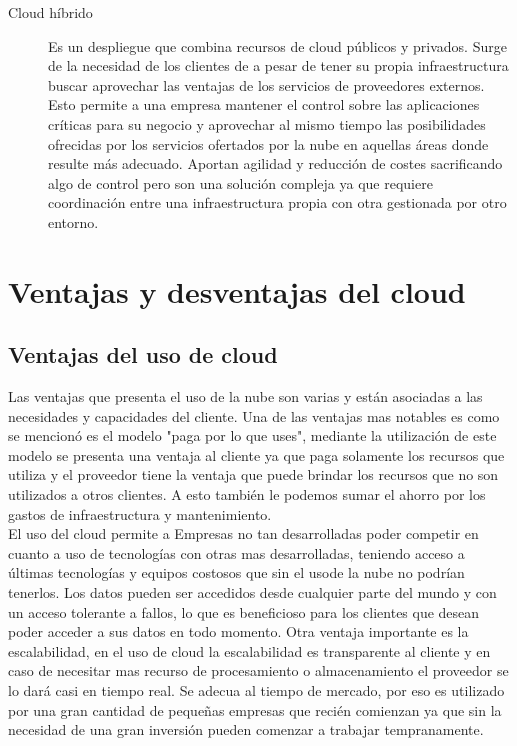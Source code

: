 \begin{description}
\item[Cloud híbrido]
Es un despliegue que combina recursos de cloud públicos y privados. Surge de la necesidad de los clientes de a pesar de tener su propia infraestructura buscar aprovechar las ventajas de los servicios de proveedores externos.
Esto permite a una empresa mantener el control sobre las aplicaciones críticas para su negocio y aprovechar al mismo tiempo las posibilidades ofrecidas por los servicios ofertados por la nube en aquellas áreas donde resulte más adecuado. Aportan agilidad y reducción de costes sacrificando algo de control pero son una solución compleja ya que requiere coordinación entre una infraestructura propia con otra gestionada por otro entorno.   

\end{description}

\section{Ventajas y desventajas del cloud}
	\subsection {Ventajas del uso de cloud}
	Las ventajas que presenta el uso de la nube son varias y están asociadas a las necesidades y capacidades del cliente. Una de las ventajas mas notables es como se mencionó es el modelo "paga por lo que uses", mediante la utilización de este modelo se presenta una ventaja al cliente ya que paga solamente los recursos que utiliza y el proveedor tiene la ventaja que puede brindar los recursos que no son utilizados a otros clientes. A esto también le podemos sumar el ahorro por los gastos de infraestructura y mantenimiento. \\ 
    El uso del cloud permite a Empresas no tan desarrolladas poder competir en cuanto a uso de tecnologías con otras mas desarrolladas, teniendo acceso a últimas tecnologías y equipos costosos que sin el usode la nube no podrían tenerlos.
    Los datos pueden ser accedidos desde cualquier parte del mundo y con un acceso tolerante a fallos, lo que es beneficioso para los clientes que desean poder acceder a sus datos en todo momento.
    Otra ventaja importante es la escalabilidad, en el uso de cloud la escalabilidad es transparente al cliente y en caso de necesitar mas recurso de procesamiento o almacenamiento el proveedor se lo dará casi en tiempo real. 
    Se adecua al tiempo de mercado, por eso es utilizado por una gran cantidad de pequeñas empresas que recién comienzan ya que sin la necesidad de una gran inversión pueden comenzar a trabajar tempranamente.
    

